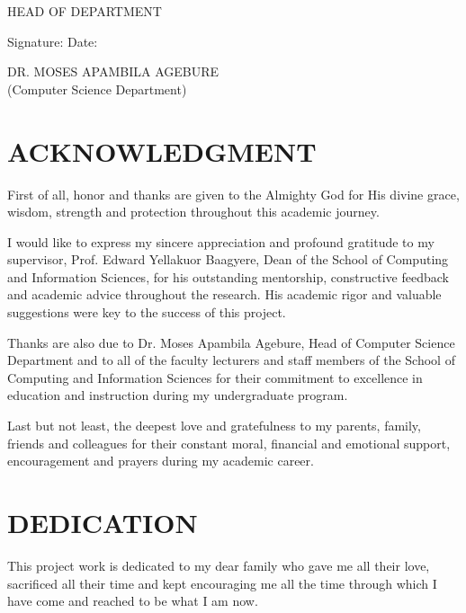 \documentclass[12pt,a4paper]{report}
\begin{document}
\vspace{1.2cm}

\noindent
HEAD OF DEPARTMENT

\vspace{0.6cm}

\noindent
Signature: \makebox[2in]{\dotfill} \hspace{1cm} Date: \makebox[2in]{\dotfill}

\vspace{0.3cm}

\noindent
DR. MOSES APAMBILA AGEBURE\\
(Computer Science Department)

\newpage
\chapter*{ACKNOWLEDGMENT}
\doublespacing

First of all, honor and thanks are given to the Almighty God for His divine grace, wisdom, strength and protection throughout this academic journey.

I would like to express my sincere appreciation and profound gratitude to my supervisor, Prof. Edward Yellakuor Baagyere, Dean of the School of Computing and Information Sciences, for his outstanding mentorship, constructive feedback and academic advice throughout the research. His academic rigor and valuable suggestions were key to the success of this project.

Thanks are also due to Dr. Moses Apambila Agebure, Head of Computer Science Department and to all of the faculty lecturers and staff members of the School of Computing and Information Sciences for their commitment to excellence in education and instruction during my undergraduate program.

Last but not least, the deepest love and gratefulness to my parents, family, friends and colleagues for their constant moral, financial and emotional support, encouragement and prayers during my academic career.

\newpage
\chapter*{DEDICATION}
\doublespacing

This project work is dedicated to my dear family who gave me all their love, sacrificed all their time and kept encouraging me all the time through which I have come and reached to be what I am now.
\end{document}
